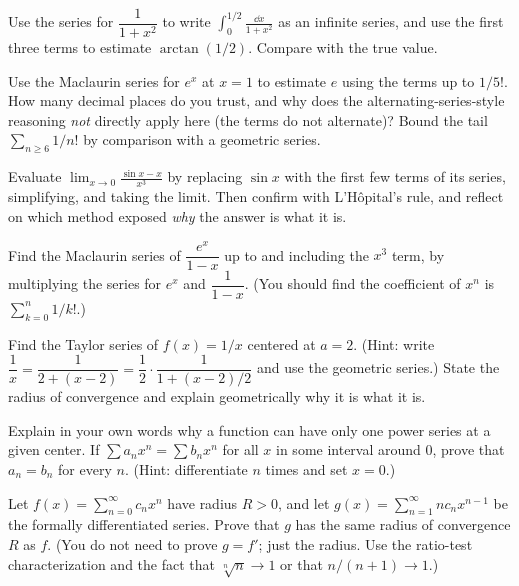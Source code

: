 \begin{exercise}
Use the series for $\dfrac{1}{1+x^2}$ to write $\displaystyle\int_0^{1/2}\frac{\dd x}{1+x^2}$ as an infinite series, and use the first three terms to estimate $\arctan(1/2)$. Compare with the true value.
\end{exercise}

\begin{exercise}
Use the Maclaurin series for $e^x$ at $x=1$ to estimate $e$ using the terms up to $1/5!$. How many decimal places do you trust, and why does the alternating-series-style reasoning \emph{not} directly apply here (the terms do not alternate)? Bound the tail $\sum_{n\ge 6} 1/n!$ by comparison with a geometric series.
\end{exercise}

\begin{exercise}
Evaluate $\displaystyle\lim_{x\to 0}\frac{\sin x - x}{x^3}$ by replacing $\sin x$ with the first few terms of its series, simplifying, and taking the limit. Then confirm with L'H\^opital's rule, and reflect on which method exposed \emph{why} the answer is what it is.
\end{exercise}

\begin{exercise}
Find the Maclaurin series of $\dfrac{e^x}{1-x}$ up to and including the $x^3$ term, by multiplying the series for $e^x$ and $\dfrac{1}{1-x}$. (You should find the coefficient of $x^n$ is $\sum_{k=0}^{n} 1/k!$.)
\end{exercise}

\begin{exercise}
Find the Taylor series of $f(x) = 1/x$ centered at $a = 2$. (Hint: write $\dfrac{1}{x} = \dfrac{1}{2 + (x-2)} = \dfrac{1}{2}\cdot\dfrac{1}{1 + (x-2)/2}$ and use the geometric series.) State the radius of convergence and explain geometrically why it is what it is.
\end{exercise}

\begin{exercise}
Explain in your own words why a function can have only one power series at a given center. If $\sum a_n x^n = \sum b_n x^n$ for all $x$ in some interval around $0$, prove that $a_n = b_n$ for every $n$. (Hint: differentiate $n$ times and set $x=0$.)
\end{exercise}

\begin{exercise}
Let $f(x) = \sum_{n=0}^{\infty} c_n x^n$ have radius $R>0$, and let $g(x) = \sum_{n=1}^{\infty} n c_n x^{n-1}$ be the formally differentiated series. Prove that $g$ has the same radius of convergence $R$ as $f$. (You do not need to prove $g = f'$; just the radius. Use the ratio-test characterization and the fact that $\sqrt[n]{n}\to 1$ or that $n/(n+1)\to 1$.)
\end{exercise}

